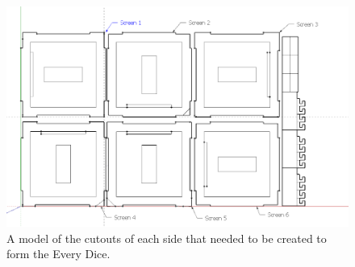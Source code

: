 \begin{figure}[ht!]
	\centering


	\includegraphics[width=1.0\linewidth]{./figures/cutouts.png}
	
	\caption[Every Dice Side Cutouts]{A model of the cutouts of each side that needed to be created to form the Every Dice.}
	
	\label{fig:dice_cutouts}
	
\end{figure}